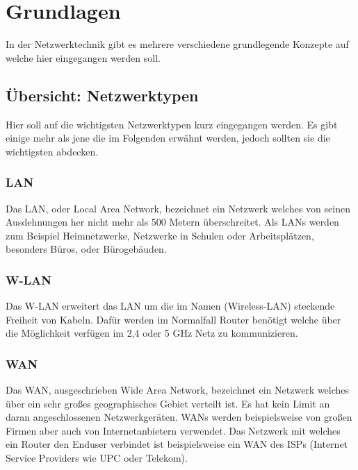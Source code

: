 \documentclass[11pt,a4paper]{report}
\begin{document}
\section{Grundlagen}
In der Netzwerktechnik gibt es mehrere verschiedene grundlegende Konzepte auf welche hier eingegangen werden soll.
\subsection{Übersicht: Netzwerktypen}
Hier soll auf die wichtigsten Netzwerktypen kurz eingegangen werden. Es gibt einige mehr als jene die im Folgenden erwähnt werden, jedoch sollten sie die wichtigsten abdecken.
\subsubsection{LAN}
Das LAN, oder Local Area Network, bezeichnet ein Netzwerk welches von seinen Ausdehnungen her nicht mehr als 500 Metern überschreitet. Als LANs werden zum Beispiel Heimnetzwerke, Netzwerke in Schulen oder Arbeitsplätzen, besonders Büros, oder Bürogebäuden.
\subsubsection{W-LAN}
Das W-LAN erweitert das LAN um die im Namen (Wireless-LAN) steckende Freiheit von Kabeln. Dafür werden im Normalfall Router benötigt welche über die Möglichkeit verfügen im 2,4 oder 5 GHz Netz zu kommunizieren.
\subsubsection{WAN}
Das WAN, ausgeschrieben Wide Area Network, bezeichnet ein Netzwerk welches über ein sehr großes geographisches Gebiet verteilt ist. Es hat kein Limit an daran angeschlossenen Netzwerkgeräten. WANs werden beispielsweise von großen Firmen aber auch von Internetanbietern verwendet. Das Netzwerk mit welches ein Router den Enduser verbindet ist beispielsweise ein WAN des ISPs (Internet Service Providers wie UPC oder Telekom). 
\end{document}
